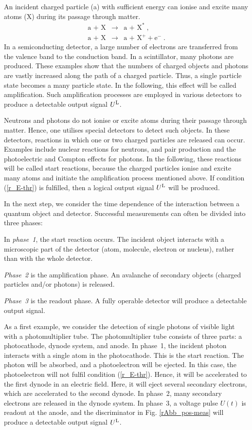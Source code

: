 \documentclass[11pt,a4paper]{article}
\begin{document}
An incident charged particle (a) with sufficient energy can ionise and excite many atoms (X) during its passage through matter.  
%
\begin{eqnarray}
\mbox{a + X} & \to & \mbox{a + X}^* \;,  \label{r_Anrg}\\
\mbox{a + X} & \to & \mbox{a + X}^+ + \mbox{e}^- \;.   \label{r_Ionis}
\end{eqnarray}
%
In a semiconducting detector, a large number of electrons are transferred from the valence band to the conduction band.  
In a scintillator, many photons are produced.  
These examples show that the numbers of charged objects and photons are vastly increased along the path of a charged particle.  
Thus, a single particle state becomes a many particle state.  
In the following, this effect will be called amplification.  
Such amplification processes are employed in various detectors to produce a detectable output signal $U^{\rm L}$.  

Neutrons and photons do not ionise or excite atoms during their passage through matter.  Hence, one utilises special detectors to detect such objects.  
In these detectors, reactions in which one or two charged particles are released can occur.  
Examples include nuclear reactions for neutrons, and pair production and the photoelectric and Compton effects for photons.  
In the following, these reactions will be called start reactions, because the charged particles ionise and excite many atoms and initiate the amplification process mentioned above.  If condition (\ref{r_E-thr}) is fulfilled, then a logical output signal $U^{\rm L}$ will be produced.  

In the next step, we consider the time dependence of the interaction between a quantum object and detector.  
Successful measurements can often be divided into three phases:  

In \emph{phase~1}, the start reaction occurs.  
The incident object interacts with a microscopic part of the detector (atom, molecule, electron or nucleus), rather than with the whole detector.  

\emph{Phase~2} is the amplification phase. An avalanche of secondary objects (charged particles and/or photons) is released.  

\emph{Phase~3} is the readout phase. A fully operable detector will produce a detectable output signal.  

As a first example, we consider the detection of single photons of visible light with a photomultiplier tube.  The photomultiplier tube consists of three parts: a photocathode, dynode system, and anode.  
In phase~1, the incident photon interacts with a single atom in the photocathode.  This is the start reaction.  
The photon will be absorbed, and a photoelectron will be ejected.  
In this case, the photoelectron will not fulfil condition (\ref{r_E-thr}).  
Hence, it will be accelerated to the first dynode in an electric field.  
Here, it will eject several secondary electrons, which are accelerated to the second dynode.  
In phase~2, many secondary electrons are released in the dynode system.  In phase~3, a voltage pulse $U(t)$ is readout at the anode, and the discriminator in Fig. \ref{rAbb_pos-meas} will produce a detectable output signal $U^{\rm L}$.  
\end{document}
